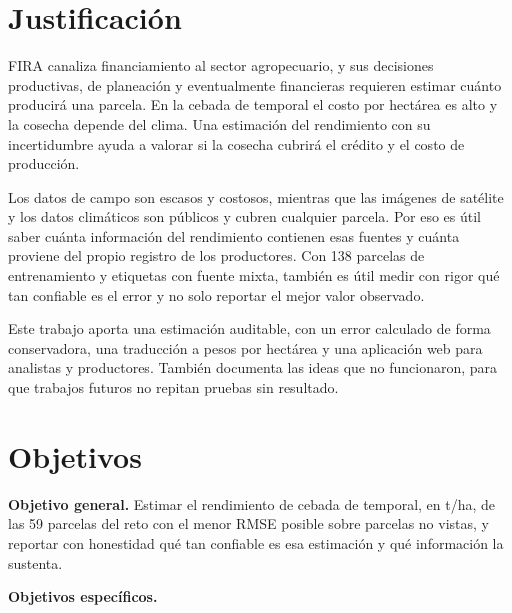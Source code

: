 \documentclass[11pt,letterpaper]{article}
\begin{document}
\section{Justificación}

FIRA canaliza financiamiento al sector agropecuario, y sus decisiones productivas, de planeación y eventualmente financieras requieren estimar cuánto producirá una parcela. En la cebada de temporal el costo por hectárea es alto y la cosecha depende del clima. Una estimación del rendimiento con su incertidumbre ayuda a valorar si la cosecha cubrirá el crédito y el costo de producción.

Los datos de campo son escasos y costosos, mientras que las imágenes de satélite y los datos climáticos son públicos y cubren cualquier parcela. Por eso es útil saber cuánta información del rendimiento contienen esas fuentes y cuánta proviene del propio registro de los productores. Con 138 parcelas de entrenamiento y etiquetas con fuente mixta, también es útil medir con rigor qué tan confiable es el error y no solo reportar el mejor valor observado.

Este trabajo aporta una estimación auditable, con un error calculado de forma conservadora, una traducción a pesos por hectárea y una aplicación web para analistas y productores. También documenta las ideas que no funcionaron, para que trabajos futuros no repitan pruebas sin resultado.

\section{Objetivos}

\textbf{Objetivo general.} Estimar el rendimiento de cebada de temporal, en t/ha, de las 59 parcelas del reto con el menor RMSE posible sobre parcelas no vistas, y reportar con honestidad qué tan confiable es esa estimación y qué información la sustenta.

\textbf{Objetivos específicos.}
\end{document}
